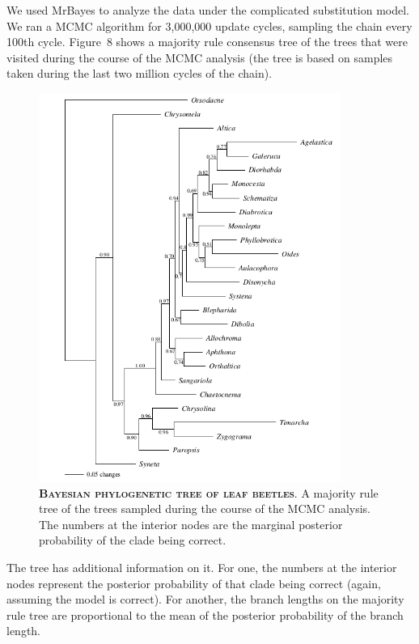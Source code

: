 \documentclass{svmult}
\begin{document}
We used MrBayes to analyze the data under the complicated substitution model. We ran a MCMC
algorithm for 3,000,000 update cycles, sampling the chain every 100th cycle. Figure~8 shows a
majority rule consensus tree of the trees that were visited during the course of the MCMC analysis
(the tree is based on samples taken during the last two million cycles of the chain). 
\begin{figure}[t]
\centering
\includegraphics[height=5in]{fig8}
\caption{\textbf{\textsc{Bayesian phylogenetic tree of leaf beetles}}.
A majority rule tree of the trees sampled during the course of the MCMC analysis. The numbers at 
the interior nodes are the marginal posterior probability of the clade being correct.}
\label{fig8}
\end{figure}
The tree has additional information on it. For one, the numbers at the interior nodes represent the
posterior probability of that clade being correct (again, assuming the model is correct). For
another, the branch lengths on the majority rule tree are proportional to the mean of the posterior
probability of the branch length. 
\end{document}

